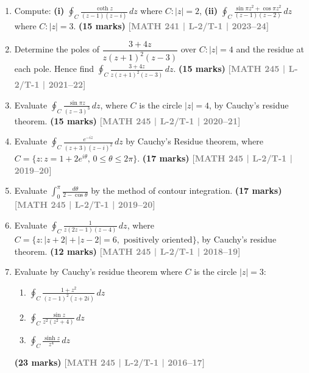 \documentclass[12pt]{article}
\newcommand{\yr}[1]{\hfill\textcolor{gray}{\small\textbf{[#1]}}}
\newcommand{\mk}[1]{\textcolor{orange!70!black}{\small\textbf{(#1 marks)}}}
\begin{document}
\begin{enumerate}

  
\item Compute: \textbf{(i)} $\displaystyle\oint_{C}\frac{\coth z}{(z-1)(z-i)}\,dz$ where $C:|z|=2$, \quad \textbf{(ii)} $\displaystyle\oint_{C}\frac{\sin\pi z^{2}+\cos\pi z^{2}}{(z-1)(z-2)}\,dz$ where $C:|z|=3$.
\mk{15} \yr{MATH 241 | L-2/T-1 | 2023--24}



\item Determine the poles of $\dfrac{3+4z}{z(z+1)^{2}(z-3)}$ over $C:|z|=4$ and the residue at each pole. Hence find $\displaystyle\oint_{C}\frac{3+4z}{z(z+1)^{2}(z-3)}\,dz$.
\mk{15} \yr{MATH 245 | L-2/T-1 | 2021--22}



\item Evaluate $\displaystyle\oint_{C} \frac{\sin\pi z}{(z-3)^{3}}\,dz$, where $C$ is the circle $|z|=4$, by Cauchy's residue theorem.
\mk{15} \yr{MATH 245 | L-2/T-1 | 2020--21}



\item Evaluate $\displaystyle\oint_{C}\frac{e^{-iz}}{(z+3)(z-i)^{2}}\,dz$ by Cauchy's Residue theorem, where $C=\{z:z=1+2e^{i\theta},\,0\le\theta\le 2\pi\}$.
\mk{17} \yr{MATH 245 | L-2/T-1 | 2019--20}



\item Evaluate $\displaystyle\int_{0}^{\pi}\frac{d\theta}{2-\cos\theta}$ by the method of contour integration.
\mk{17} \yr{MATH 245 | L-2/T-1 | 2019--20}



\item Evaluate $\displaystyle\oint_{C}\frac{1}{z(2z-1)(z-4)}\,dz$, where $C=\{z:|z+2|+|z-2|=6,\text{ positively oriented}\}$, by Cauchy's residue theorem.
\mk{12} \yr{MATH 245 | L-2/T-1 | 2018--19}



\item Evaluate by Cauchy's residue theorem where $C$ is the circle $|z|=3$:
\begin{enumerate}
  \item $\displaystyle\oint_{C}\frac{1+z^{2}}{(z-1)^{2}(z+2i)}\,dz$
  \item $\displaystyle\oint_{C}\frac{\sin z}{z^{2}(z^{2}+4)}\,dz$
  \item $\displaystyle\oint_{C}\frac{\sinh z}{z^{4}}\,dz$
\end{enumerate}
\mk{23} \yr{MATH 245 | L-2/T-1 | 2016--17}




\end{enumerate}
\end{document}
